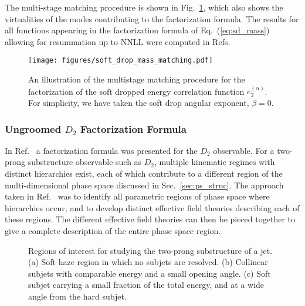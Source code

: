 \documentclass[a4paper,11pt]{article}
\newcommand{\ecf}[2]{e_{#1}^{(#2)}}
\DeclareRobustCommand{\Sec}[1]{Sec.~\ref{#1}}
\DeclareRobustCommand{\Fig}[1]{Fig.~\ref{#1}}
\DeclareRobustCommand{\Eq}[1]{Eq.~(\ref{#1})}
\DeclareRobustCommand{\Ref}[1]{Ref.~\cite{#1}}
\DeclareRobustCommand{\Refs}[1]{Refs.~\cite{#1}}
\begin{document}
The multi-stage matching procedure is shown in \Fig{fig:sd_mass_match}, which also shows the virtualities of the modes contributing to the factorization formula. The results for all functions appearing in the factorization formula of \Eq{eq:sd_mass} allowing for resummation up to NNLL were computed in  \Refs{Frye:2016okc,Frye:2016aiz}

\begin{figure}
\begin{center}
\texttt{[image: figures/soft\_drop\_mass\_matching.pdf]}
\end{center}
\caption{An illustration of the multistage matching procedure for the factorization of the soft dropped energy correlation function $\ecf{2}{\alpha}$. For simplicity, we have taken the soft drop angular exponent, $\beta=0$.
}
\label{fig:sd_mass_match}
\end{figure}

\subsubsection{Ungroomed $D_2$ Factorization Formula}\label{sec:fact_review_ungD2}





In \Ref{Larkoski:2015kga} a factorization formula was presented for the $D_2$ observable. For a two-prong substructure observable such as $D_2$, multiple kinematic regimes with distinct hierarchies exist, each of which contribute to a different region of the multi-dimensional phase space discussed in \Sec{sec:ps_struc}. The approach taken in \Ref{Larkoski:2015kga} was to identify all parametric regions of phase space where hierarchies occur, and to develop distinct effective field theories describing each of these regions. The different effective field theories can then be pieced together to give a complete description of the entire phase space region.


\begin{figure}
\begin{center}
\qquad
{}\qquad
{}
\end{center}
\caption{Regions of interest for studying the two-prong substructure of a jet. (a) Soft haze region in which no subjets are resolved. (b) Collinear subjets with comparable energy and a small opening angle. (c) Soft subjet carrying a small fraction of the total energy, and at a wide angle from the hard subjet.}
\label{fig:diff_jets}
\end{figure}
\end{document}
